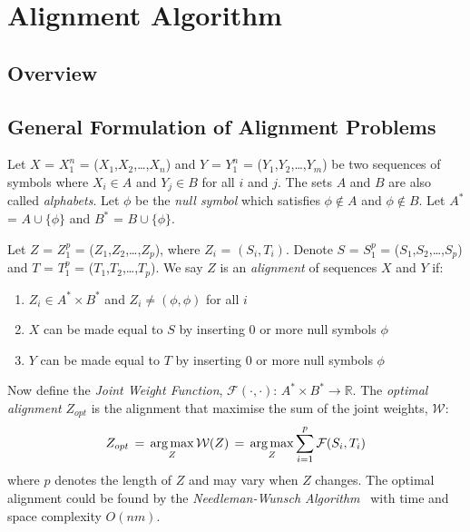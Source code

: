 
\chapter{Alignment Algorithm}

\ifpdf
    \graphicspath{{Chapter5/Figs/Raster/}{Chapter5/Figs/PDF/}{Chapter5/Figs/}}
\else
    \graphicspath{{Chapter5/Figs/Vector/}{Chapter5/Figs/}}
\fi


\section{Overview}

\section{General Formulation of Alignment Problems}
\label{sec:diff-formulation}

Let $X$ = $X_1^n$ = ($X_1$,$X_2$,\ldots,$X_n$) and $Y$ = $Y_1^n$ = ($Y_1$,$Y_2$,\ldots,$Y_m$) be two sequences of symbols where $X_i \in A$ and $Y_j \in B$ for all $i$ and $j$. The sets $A$ and $B$ are also called \textit{alphabets}. Let $\phi$ be the \textit{null symbol} which satisfies $\phi \notin A$ and $\phi \notin B$. Let $A^*$ = $A\cup\{\phi\}$ and $B^*$ = $B\cup\{\phi\}$.

Let $Z$ = $Z_1^p$ = ($Z_1$,$Z_2$,\ldots,$Z_p$), where $Z_i$ = $(S_i, T_i)$. Denote $S$ = $S_1^p$ = ($S_1$,$S_2$,\ldots,$S_p$) and $T$ = $T_1^p$ = ($T_1$,$T_2$,\ldots,$T_p$). We say $Z$ is an \textit{alignment} of sequences $X$ and $Y$ if:
\begin{enumerate}
  \item $Z_i \in A^* \times B^*$ and $Z_i \neq (\phi,\phi)$ for all $i$
  \item $X$ can be made equal to $S$ by inserting 0 or more null symbols $\phi$
  \item $Y$ can be made equal to $T$ by inserting 0 or more null symbols $\phi$
\end{enumerate}

Now define the \textit{Joint Weight Function}, $\mathcal{F}(\cdot,\cdot)$: $A^* \times B^* \to \mathbb{R}$. The \textit{optimal alignment} $Z_{opt}$ is the alignment that maximise the sum of the joint weights, $\mathcal{W}$:
\begin{equation}
  Z_{opt} \,=\, \operatorname*{arg\,max}_{Z} \mathcal{W}(Z) \,=\, \operatorname*{arg\,max}_{Z} \sum_{i=1}^{p} \mathcal{F}(S_i,T_i)
\end{equation}
where $p$ denotes the length of $Z$ and may vary when $Z$ changes. The optimal alignment could be found by the \textit{Needleman-Wunsch Algorithm}~\cite{needleman1970general} with time and space complexity $O(nm)$.

